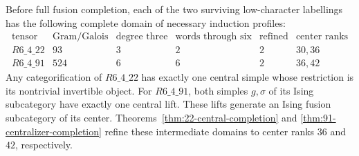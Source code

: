 \begin{proposition}
\label{prop:round4-quartic-frontier}
Before full fusion completion, each of the two surviving low-character
labellings has the following complete domain of necessary induction profiles:
\[
\begin{array}{c|r|r|r|r|l}
\text{tensor}&\text{Gram/Galois}&\text{degree three}&
 \text{words through six}&\text{refined}&\text{center ranks}\\\hline
R6\_4\_22&93&3&2&2&30,36\\
R6\_4\_91&524&6&6&2&36,42
\end{array}
\]
Any categorification of $R6\_4\_22$ has exactly one central simple whose
restriction is its nontrivial invertible object.  For $R6\_4\_91$, both
simples $g,\sigma$ of its Ising subcategory have exactly one central lift.
These lifts generate an Ising fusion subcategory of its center.
Theorems~\ref{thm:22-central-completion} and
\ref{thm:91-centralizer-completion} refine these intermediate domains
to center ranks $36$ and $42$, respectively.
\end{proposition}
